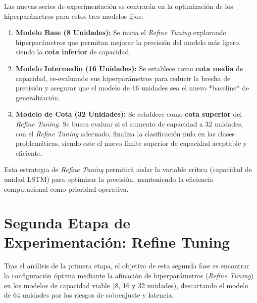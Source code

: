Las nuevas series de experimentación se centrarán en la optimización de los hiperparámetros para estos tres modelos fijos:

\begin{enumerate}
    \item \textbf{Modelo Base (8 Unidades):} Se inicia el \textit{Refine Tuning} explorando hiperparámetros que permitan mejorar la precisión del modelo más ligero, siendo la \textbf{cota inferior} de capacidad.
    \item \textbf{Modelo Intermedio (16 Unidades):} Se establece como \textbf{cota media} de capacidad, re-evaluando sus hiperparámetros para reducir la brecha de precisión y asegurar que el modelo de 16 unidades sea el nuevo *baseline* de generalización.
    \item \textbf{Modelo de Cota (32 Unidades):} Se establece como \textbf{cota superior} del \textit{Refine Tuning}. Se busca evaluar si el aumento de capacidad a 32 unidades, con el \textit{Refine Tuning} adecuado, finaliza la clasificación nula en las clases problemáticas, siendo este el nuevo límite superior de capacidad aceptable y eficiente.
\end{enumerate}

Esta estrategia de \textit{Refine Tuning} permitirá aislar la variable crítica (capacidad de unidad LSTM) para optimizar la precisión, manteniendo la eficiencia computacional como prioridad operativa.

\FloatBarrier


\section{Segunda Etapa de Experimentación: Refine Tuning}
\label{sec:refine_tuning}

Tras el análisis de la primera etapa, el objetivo de esta segunda fase es encontrar la configuración óptima mediante la afinación de hiperparámetros (\textit{Refine Tuning}) en los modelos de capacidad viable (8, 16 y 32 unidades), descartando el modelo de 64 unidades por los riesgos de sobreajuste y latencia.

